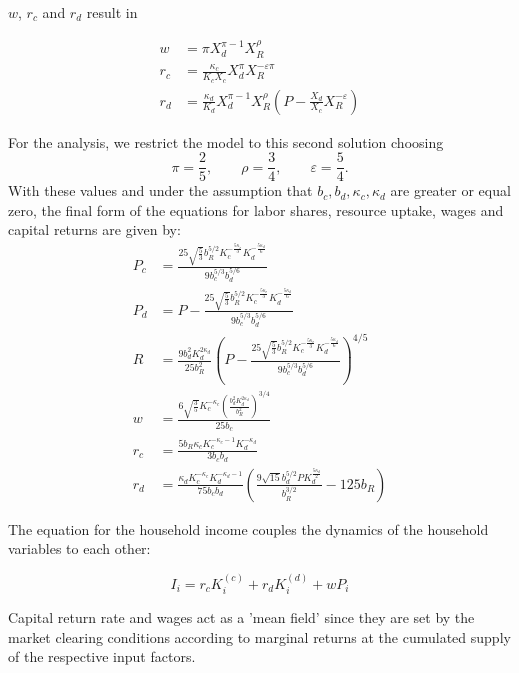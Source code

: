 $w$, $r_c$ and $r_d$ result in

\begin{align}
	w &= \pi X_d^{\pi-1} X_R ^{\rho} \\
	r_c &= \frac{\kappa_c}{K_c X_c}X_d^{\pi}X_R^{-\varepsilon \pi} \\
	r_d &= \frac{\kappa_d}{K_d}X_d^{\pi-1}X_R^{\rho}\left( P -\frac{X_d}{X_c}X_R^{-\varepsilon}\right)
\end{align}

For the analysis, we restrict the model to this second solution choosing 
\begin{equation}
	\pi = \frac{2}{5}, \qquad \rho = \frac{3}{4}, \qquad \varepsilon = \frac{5}{4}.
	\label{exponent_values}
\end{equation}
With these values and under the assumption that $b_c, b_d, \kappa_c, \kappa_d$ are greater or equal zero, the final form of the equations for labor shares, resource uptake, wages and capital returns are given by:
\begin{align}
	P_c &=\frac{25 \sqrt{\frac{5}{3}} b_R^{5/2} K_c^{-\frac{5 \kappa_c}{3}} K_d^{-\frac{5 \kappa_d}{6}}}{9 b_c^{5/3} b_d^{5/6}} \\
	P_d &=P-\frac{25 \sqrt{\frac{5}{3}} b_R^{5/2} K_c^{-\frac{5 \kappa_c}{3}} K_d^{-\frac{5 \kappa_d}{6}}}{9 b_c^{5/3} b_d^{5/6}} \\
	R   &=\frac{9 b_d^2 K_d^{2 \kappa_d}}{25 b_R^2}  \left(P-\frac{25 \sqrt{\frac{5}{3}} b_R^{5/2} K_c^{-\frac{5 \kappa_c}{3}} K_d^{-\frac{5 \kappa_d}{6}}}{9 b_c^{5/3} b_d^{5/6}}\right)^{4/5}\\
	w   &=\frac{6 \sqrt{\frac{3}{5}} K_c^{-\kappa_c} \left(\frac{b_d^2 K_d^{2 \kappa_d}}{b_R^2}\right)^{3/4}}{25 b_c} \\
	r_c &=\frac{5 b_R \kappa_c K_c^{-\kappa_c-1} K_d^{-\kappa_d}}{3 b_c b_d} \\
	r_d &=\frac{\kappa_d K_c^{-\kappa_c} K_d^{-\kappa_d-1}}{75 b_c b_d}  \left(\frac{9 \sqrt{15} b_d^{5/2} P K_d^{\frac{5 \kappa_d}{2}}}{b_R^{3/2}}-125 b_R\right)
\end{align}

The equation for the household income couples the dynamics of the household variables to each other:

\begin{equation}
	I_i = r_c K_i^{(c)} + r_d K_i^{(d)} + wP_i
	\label{household_income}
\end{equation}

Capital return rate and wages act as a 'mean field' since they are set by the market clearing conditions according to marginal returns at the cumulated supply of the respective input factors. \\


